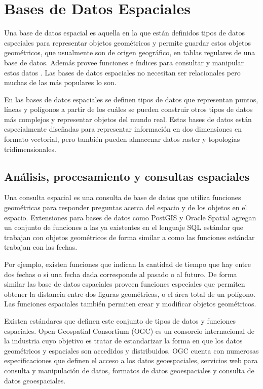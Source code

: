 \section{Bases de Datos Espaciales}

Una base de datos espacial es aquella en la que están definidos tipos de datos especiales para representar objetos geométricos y permite guardar estos objetos geométricos, que usualmente son de origen geográfico, en tablas regulares de una base de datos. Además provee funciones e índices para consultar y manipular estos datos \cite{obe2011postgis}. Las bases de datos espaciales no necesitan ser relacionales pero muchas de las más populares lo son.

En las bases de datos espaciales se definen tipos de datos que representan puntos, líneas y polígonos a partir de los cuáles se pueden construir otros tipos de datos más complejos y representar objetos del mundo real. Estas bases de datos están especialmente diseñadas para representar información en dos dimensiones en formato vectorial, pero también pueden almacenar datos raster y topologías tridimensionales.

\subsection{Análisis, procesamiento y consultas espaciales}

Una consulta espacial es una consulta de base de datos que utiliza funciones geométricas para responder preguntas acerca del espacio y de los objetos en el espacio. Extensiones para bases de datos como PostGIS y Oracle Spatial agregan un conjunto de funciones a las ya existentes en el lenguaje SQL estándar que trabajan con objetos geométricos de forma similar a como las funciones estándar trabajan con las fechas.

Por ejemplo, existen funciones que indican la cantidad de tiempo que hay entre dos fechas o si una fecha dada corresponde al pasado o al futuro. De forma similar las base de datos espaciales proveen funciones especiales que permiten obtener la distancia entre dos figuras geométricas, o el área total de un polígono. Las funciones espaciales también permiten crear y modificar objetos geométricos.

Existen estándares que definen este conjunto de tipos de datos y funciones espaciales. Open Geospatial Consortium (OGC) es un consorcio internacional de la industria cuyo objetivo es tratar de estandarizar la forma en que los datos geométricos y espaciales son accedidos y distribuidos. OGC cuenta con numerosas especificaciones que definen el acceso a los datos geoespaciales, servicios web para consulta y manipulación de datos, formatos de datos geoespaciales y consulta de datos geoespaciales.

